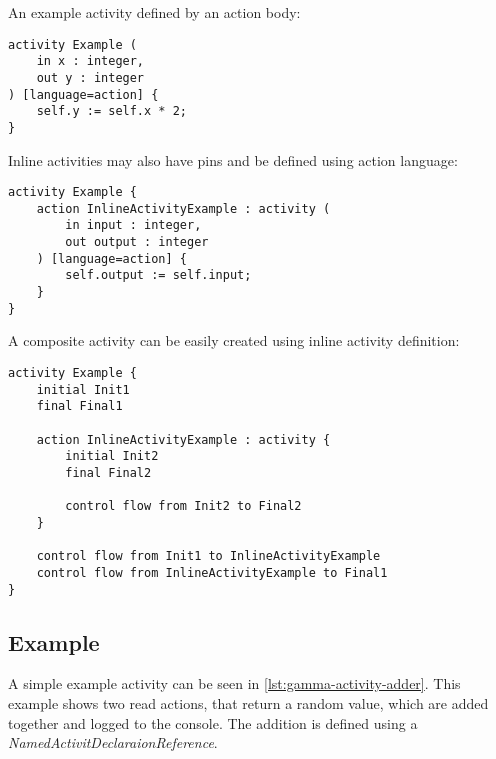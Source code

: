 An example activity defined by an action body:

\begin{lstlisting}[language=activity]
activity Example (
	in x : integer,
	out y : integer
) [language=action] {
	self.y := self.x * 2;
}
\end{lstlisting}

Inline activities may also have pins and be defined using action language:

\begin{lstlisting}[language=activity]
activity Example {
	action InlineActivityExample : activity (
		in input : integer,
		out output : integer
	) [language=action] {
		self.output := self.input;
	}
}
\end{lstlisting}

A composite activity can be easily created using inline activity definition:

\begin{lstlisting}[language=activity]
activity Example {
	initial Init1
	final Final1
	
	action InlineActivityExample : activity {
		initial Init2
		final Final2
		
		control flow from Init2 to Final2
	}

	control flow from Init1 to InlineActivityExample
	control flow from InlineActivityExample to Final1
}
\end{lstlisting}

\subsection*{Example}

A simple example activity can be seen in \autoref{lst:gamma-activity-adder}. This example shows two read actions, that return a random value, which are added together and logged to the console. The addition is defined using a \emph{NamedActivitDeclaraionReference}.


